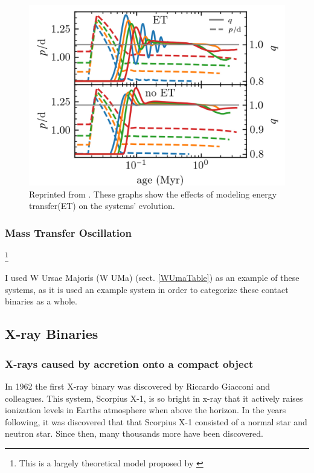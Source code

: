 \documentclass[12pt, a4paper]{article}
\begin{document}
        \begin{figure}[H]
            \centering
            \includegraphics[scale = .3]{figs/reused-figs/q-ratio_evolution_farby.png}
            \caption{Reprinted from \parencite{Fabry_2025}. These graphs show the effects of modeling energy transfer(ET) on the systems' evolution.}
            \label{qEvolution}
        \end{figure}

        \subsubsection{Mass Transfer Oscillation} \label{MassTransferOscillation} \footnote{This is a largely theoretical model proposed by \cite{Fabry_2025}}
        
        I used W Ursae Majoris (W UMa) (sect. \ref{WUmaTable}) as an example of these systems, as it is used an example system in order to categorize these contact binaries as a whole.
    \subsection{X-ray Binaries} 
        \subsubsection{X-rays caused by accretion onto a compact object} \label{XrayAccretion}
            In 1962 the first X-ray binary was discovered by Riccardo Giacconi and colleagues. This system, Scorpius X-1, is so bright in x-ray that it actively raises ionization levels in Earths atmosphere when above the horizon. \parencite{TaurisvandenHeuvel+2023} \parencite{Giacconi_1962} In the years following, it was discovered that that Scorpius X-1 consisted of a normal star and neutron star. Since then, many thousands more have been discovered\parencite{Haardt_1993}.
\end{document}
